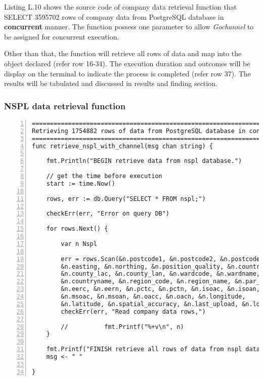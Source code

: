 Listing L.10 shows the source code of company data retrieval function that SELECT 3595702 rows of company data from PostgreSQL database in \textbf{concurrent} manner. The function possess one parameter to allow \textit{Gochannel} to be assigned for concurrent execution. 

Other than that, the function will retrieve all rows of data and map into the object declared (refer row 16-34). The execution duration and outcomes will be display on the terminal to indicate the process is completed (refer row 37). The results will be tabulated and discussed in results and finding section. 

\newpage

\subsubsection{NSPL data retrieval function}

\lstset{basicstyle=\ttfamily\tiny}  
\begin{lstlisting}[breaklines, frame=single, numbers=left, caption={Function for NSPL data retrieval. (retrieve\_nspl.go)}, label=commandline-02]
=============================================================================
Retrieving 1754882 rows of data from PostgreSQL database in concurrent manner
=============================================================================
func retrieve_nspl_with_channel(msg chan string) {

	fmt.Println("BEGIN retrieve data from nspl database.")
	
	// get the time before execution
	start := time.Now()
	
	rows, err := db.Query("SELECT * FROM nspl;")
	
	checkErr(err, "Error on query DB")	
	
	for rows.Next() {
	
		var n Nspl
		
		err = rows.Scan(&n.postcode1, &n.postcode2, &n.postcode3, &n.date_introduce, &n.usertype,
		&n.easting, &n.northing, &n.position_quality, &n.countrycode, &n.countryname,
		&n.county_lac, &n.county_lan, &n.wardcode, &n.wardname, &n.countrycode,
		&n.countryname, &n.region_code, &n.region_name, &n.par_cons_code, &n.par_cons_name,
		&n.eerc, &n.eern, &n.pctc, &n.pctn, &n.isoac, &n.isoan, 
		&n.msoac, &n.msoan, &n.oacc, &n.oacn, &n.longitude,
		&n.latitude, &n.spatial_accuracy, &n.last_upload, &n.location, &n.socrataid)
		checkErr(err, "Read company data rows,")
		
		//			fmt.Printf("%+v\n", n)
	}
	
	fmt.Printf("FINISH retrieve all rows of data from nspl database with %.5fs seconds. ", time.Since(start).Seconds())
	msg <- " "

}

\end{lstlisting}

